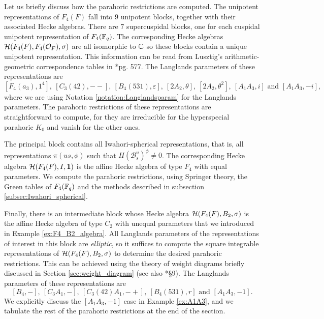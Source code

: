 Let us briefly discuss how the parahoric restrictions are computed. The unipotent representations of $F_4(F)$ fall into $9$ unipotent blocks, together with their associated Hecke algebras. There are $7$ supercuspidal blocks, one for each cuspidal unipotent representation of $F_4(\mathbb{F}_q)$. The corresponding Hecke algebras $\mathcal{H}(F_4(F),F_4(\mathcal{O}_F),\sigma)$ are all isomorphic to $\mathbb{C}$ so these blocks contain a unique unipotent representation. This information can be read from Lusztig's arithmetic-geometric correspondence tables in \cite{Lusztig1995}*{pg. 577}. The Langlands parameters of these representations are $$[F_4(a_3),1^4],\ [C_3(42),--],\ [B_4(531),\varepsilon],\ [2A_2,\theta],\ [2A_2,\theta^2],\ [A_1A_3,i]\text{ and }[A_1A_3,-i],$$
where we are using Notation \ref{notation:Langlandsparam} for the Langlands parameters. The parahoric restrictions of these representations are straightforward to compute, for they are irreducible for the hyperspecial parahoric $K_0$ and vanish for the other ones.

The principal block contains all Iwahori-spherical representations, that is, all representations $\pi(us,\phi)$ such that $H(\mathcal{B}_s^u)^{\phi}\neq 0$. The corresponding Hecke algebra $\mathcal{H}(F_4(F),I,\mathbf{1})$ is the affine Hecke algebra of type $F_4$ with equal parameters. We compute the parahoric restrictions, using Springer theory, the Green tables of $F_4(\mathbb{F}_q)$ and the methods described in subsection \ref{subsec:Iwahori_spherical}.


Finally, there is an intermediate block whose Hecke algebra $\mathcal{H}(F_4(F),B_2,\sigma)$ is the affine Hecke algebra of type $C_2$ with unequal parameters that we introduced in Example \ref{ex:F4_B2_algebra}. All Langlands parameters of the representations of interest in this block are \textit{elliptic}, so it suffices to compute the square integrable representations of $\mathcal{H}(F_4(F),B_2,\sigma)$ to determine the desired parahoric restrictions. This can be achieved using the theory of weight diagrams briefly discussed in Section \ref{sec:weight_diagram} (see also \cite{Ciubotaru2020}*{\S 9}). The Langlands parameters of these representations are $$[B_4,-],\ [C_3A_1,-],\ [C_3(42)A_1,-+],\ [B_4(531),r] \text{ and } [A_1A_3,-1].$$ 
We explicitly discuss the $[A_1A_3,-1]$ case in Example \ref{ex:A1A3}, and we tabulate the rest of the parahoric restrictions at the end of the section.

